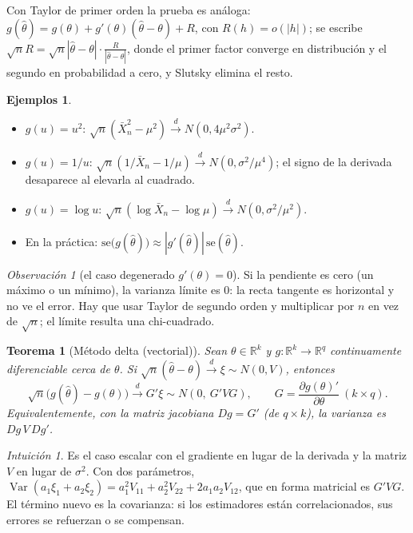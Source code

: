 \documentclass[11pt,a4paper]{article}
\theoremstyle{plain}
\newtheorem{teorema}{Teorema}[section]
\theoremstyle{definition}
\newtheorem*{ejemplos}{Ejemplos}
\theoremstyle{remark}
\newtheorem*{intuicion}{Intuición}
\newtheorem*{observacion}{Observación}
\newcommand{\R}{\mathbb{R}}
\DeclareMathOperator{\Var}{Var}
\newcommand{\cd}{\xrightarrow{\;d\;}}
\begin{document}
Con Taylor de primer orden la prueba es análoga: $g(\hat\theta)=g(\theta)+g'(\theta)
(\hat\theta-\theta)+R$, con $R(h)=o(|h|)$; se escribe
$\sqrt nR=\sqrt n|\hat\theta-\theta|\cdot\frac{R}{|\hat\theta-\theta|}$, donde el primer factor
converge en distribución y el segundo en probabilidad a cero, y Slutsky elimina el resto.

\begin{ejemplos}\leavevmode
\begin{itemize}
  \item $g(u)=u^2$: $\sqrt n(\bar X_n^2-\mu^2)\cd N(0,4\mu^2\sigma^2)$.
  \item $g(u)=1/u$: $\sqrt n(1/\bar X_n-1/\mu)\cd N(0,\sigma^2/\mu^4)$; el signo de la derivada
        desaparece al elevarla al cuadrado.
  \item $g(u)=\log u$: $\sqrt n(\log\bar X_n-\log\mu)\cd N(0,\sigma^2/\mu^2)$.
  \item En la práctica: $\text{se}\big(g(\hat\theta)\big)\approx|g'(\hat\theta)|\,
        \text{se}(\hat\theta)$.
\end{itemize}
\end{ejemplos}

\begin{observacion}[el caso degenerado $g'(\theta)=0$]
Si la pendiente es cero (un máximo o un mínimo), la varianza límite es $0$: la recta tangente es
horizontal y no ve el error. Hay que usar Taylor de segundo orden y multiplicar por $n$ en vez
de $\sqrt n$; el límite resulta una chi-cuadrado.
\end{observacion}

\begin{teorema}[Método delta (vectorial)]\label{teo:deltak}
Sean $\theta\in\R^k$ y $g:\R^k\to\R^q$ continuamente diferenciable cerca de $\theta$. Si
$\sqrt n(\hat\theta-\theta)\cd\xi\sim N(0,V)$, entonces
\[
\sqrt n\big(g(\hat\theta)-g(\theta)\big)\cd G'\xi\sim N(0,\ G'VG),\qquad
G=\frac{\partial g(\theta)'}{\partial\theta}\ (k\times q).
\]
Equivalentemente, con la matriz jacobiana $Dg=G'$ (de $q\times k$), la varianza es
$Dg\,V\,Dg'$.
\end{teorema}

\begin{intuicion}
Es el caso escalar con el gradiente en lugar de la derivada y la matriz $V$ en lugar de
$\sigma^2$. Con dos parámetros,
$\Var(a_1\xi_1+a_2\xi_2)=a_1^2V_{11}+a_2^2V_{22}+2a_1a_2V_{12}$, que en forma matricial es
$G'VG$. El término nuevo es la covarianza: si los estimadores están correlacionados, sus
errores se refuerzan o se compensan.
\end{intuicion}
\end{document}
